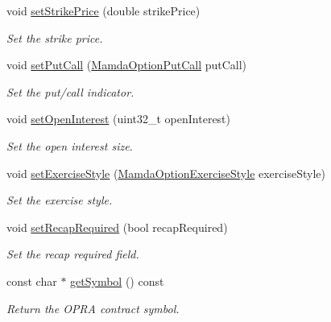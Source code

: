 \begin{CompactItemize}
void \hyperlink{classWombat_1_1MamdaOptionContract_57020e7c6f2c8d1bcd692b801714f966}{set\-Strike\-Price} (double strike\-Price)
\begin{CompactList}\small\item\em Set the strike price. \item\end{CompactList}\item 
void \hyperlink{classWombat_1_1MamdaOptionContract_60c9a0c5d47ac681b3ed1f6bb8a77cb8}{set\-Put\-Call} (\hyperlink{namespaceWombat_ceb2ef77ec6c36b48ef57d2887d6ac49}{Mamda\-Option\-Put\-Call} put\-Call)
\begin{CompactList}\small\item\em Set the put/call indicator. \item\end{CompactList}\item 
void \hyperlink{classWombat_1_1MamdaOptionContract_2a2c8b0bb79e3d20e1065559a763f6c2}{set\-Open\-Interest} (uint32\_\-t open\-Interest)
\begin{CompactList}\small\item\em Set the open interest size. \item\end{CompactList}\item 
void \hyperlink{classWombat_1_1MamdaOptionContract_f6f42f64ca7004717761c6d4bc09932a}{set\-Exercise\-Style} (\hyperlink{namespaceWombat_e7be5722df9d72164d322f2b72cf8d1a}{Mamda\-Option\-Exercise\-Style} exercise\-Style)
\begin{CompactList}\small\item\em Set the exercise style. \item\end{CompactList}\item 
void \hyperlink{classWombat_1_1MamdaOptionContract_d2685768085c33dd51dc71c65b4804fa}{set\-Recap\-Required} (bool recap\-Required)
\begin{CompactList}\small\item\em Set the recap required field. \item\end{CompactList}\item 
const char $\ast$ \hyperlink{classWombat_1_1MamdaOptionContract_5e8339a42581c6ca70da3c7d1907a57b}{get\-Symbol} () const 
\begin{CompactList}\small\item\em Return the OPRA contract symbol. \item\end{CompactList}\item 

\end{CompactItemize}
